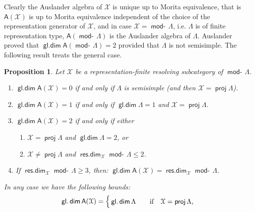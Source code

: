\documentclass[oneside, a4paper,reqno]{amsart}
\numberwithin{equation}{section}
\newtheorem{prop}[thm]{Proposition}
\theoremstyle{definition}
\begin{document}
Clearly the Auslander algebra of ${\mathcal X}$ is unique up to Morita
equivalence, that is $\mathsf{A}({\mathcal X})$  is up to Morita equivalence
independent of the choice of the representation generator of ${\mathcal X}$,
and in case ${\mathcal X} = \operatorname*{\mathsf{mod}-\!}\Lambda$, i.e. $\Lambda$ is of finite
representation type,  $\mathsf{A}(\operatorname*{\mathsf{mod}-\!}\Lambda)$ is the Auslander
 algebra of $\Lambda$. Auslander proved that
$\operatorname*{\mathsf{gl.dim}}\mathsf{A}(\operatorname*{\mathsf{mod}-\!}\Lambda) = 2$ provided that $\Lambda$ is not
semisimple. The following result treats the general case.

\begin{prop} Let ${\mathcal X}$ be a representation-finite resolving subcategory of
$\operatorname*{\mathsf{mod}-\!}\Lambda$.
\begin{enumerate}
\item $\operatorname*{\mathsf{gl.dim}}\mathsf{A}({\mathcal X}) = 0$ if and only if $\Lambda$ is semisimple  (and then ${\mathcal X} = \operatorname*{\mathsf{proj}}\Lambda$).
\item $\operatorname*{\mathsf{gl.dim}}\mathsf{A}({\mathcal X}) = 1$ if and only if $\operatorname*{\mathsf{gl.dim}}\Lambda = 1$ and ${\mathcal X} = \operatorname*{\mathsf{proj}}\Lambda$.
\item $\operatorname*{\mathsf{gl.dim}}\mathsf{A}({\mathcal X}) = 2$ if and only if  either
\begin{enumerate}
\item ${\mathcal X} = \operatorname*{\mathsf{proj}}\Lambda$ and $\operatorname*{\mathsf{gl.dim}}\Lambda = 2$, or
\item ${\mathcal X} \neq \operatorname*{\mathsf{proj}}\Lambda$ and $\operatorname*{\mathsf{res.dim}}_{\mathcal X}\operatorname*{\mathsf{mod}-\!}\Lambda \leq 2$.
\end{enumerate}
\item If  $\operatorname*{\mathsf{res.dim}}_{\mathcal X}\operatorname*{\mathsf{mod}-\!}\Lambda \geq 3$, then: $\operatorname*{\mathsf{gl.dim}}\mathsf{A}({\mathcal X}) =
\operatorname*{\mathsf{res.dim}}_{\mathcal X}\operatorname*{\mathsf{mod}-\!}\Lambda$.
\end{enumerate}
In any case we have the following bounds:
\[
\operatorname*{\mathsf{gl.dim}}\mathsf{A}({\mathcal X}) =
\begin{cases} \, \operatorname*{\mathsf{gl.dim}}\Lambda \,\,\, & \,\,\, \text{if \,\, ${\mathcal X} = \operatorname*{\mathsf{proj}}\Lambda$,}
\\

\end{cases}\]
\end{prop}
\end{document}

